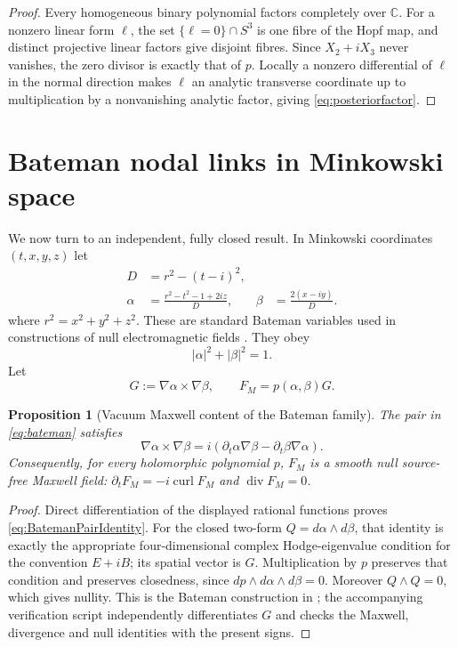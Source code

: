 \documentclass[aps,prd,reprint,nofootinbib,superscriptaddress]{revtex4-2}
\newtheorem{proposition}[theorem]{Proposition}
\theoremstyle{definition}
\theoremstyle{remark}
\newcommand{\C}{\mathbb{C}}
\newcommand{\Div}{\operatorname{div}}
\newcommand{\Curl}{\operatorname{curl}}
\begin{document}
\begin{proof}
Every homogeneous binary polynomial factors completely over $\C$. For a nonzero linear form $\ell$, the set $\{\ell=0\}\cap S^3$ is one fibre of the Hopf map, and distinct projective linear factors give disjoint fibres. Since $X_2+iX_3$ never vanishes, the zero divisor is exactly that of $p$. Locally a nonzero differential of $\ell$ in the normal direction makes $\ell$ an analytic transverse coordinate up to multiplication by a nonvanishing analytic factor, giving \eqref{eq:posteriorfactor}.
\end{proof}

\section{Bateman nodal links in Minkowski space}
\label{sec:bateman}

We now turn to an independent, fully closed result. In Minkowski coordinates $(t,x,y,z)$ let
\begin{align}
D&=r^2-(t-i)^2,\nonumber\\
\alpha&=\frac{r^2-t^2-1+2iz}{D},
&\beta&=\frac{2(x-iy)}{D}.
\label{eq:bateman}
\end{align}
where $r^2=x^2+y^2+z^2$. These are standard Bateman variables used in constructions of null electromagnetic fields \cite{Kedia2013,IrvineBouwmeester2008}. They obey
\begin{equation}
|\alpha|^2+|\beta|^2=1.
\label{eq:S3identity}
\end{equation}
Let
\begin{equation}
G:=\nabla\alpha\times\nabla\beta,
\qquad
F_M=p(\alpha,\beta)G.
\label{eq:FM}
\end{equation}

\begin{proposition}[Vacuum Maxwell content of the Bateman family]
\label{prop:BatemanMaxwell}
The pair in \eqref{eq:bateman} satisfies
\begin{equation}
\nabla\alpha\times\nabla\beta
=i(\partial_t\alpha\nabla\beta-\partial_t\beta\nabla\alpha).
\label{eq:BatemanPairIdentity}
\end{equation}
Consequently, for every holomorphic polynomial $p$, $F_M$ is a smooth null source-free Maxwell field: $\partial_tF_M=-i\Curl F_M$ and $\Div F_M=0$.
\end{proposition}
\begin{proof}
Direct differentiation of the displayed rational functions proves \eqref{eq:BatemanPairIdentity}. For the closed two-form $Q=d\alpha\wedge d\beta$, that identity is exactly the appropriate four-dimensional complex Hodge-eigenvalue condition for the convention $E+iB$; its spatial vector is $G$. Multiplication by $p$ preserves that condition and preserves closedness, since $dp\wedge d\alpha\wedge d\beta=0$. Moreover $Q\wedge Q=0$, which gives nullity. This is the Bateman construction in \cite{Kedia2013}; the accompanying verification script independently differentiates $G$ and checks the Maxwell, divergence and null identities with the present signs.
\end{proof}
\end{document}
